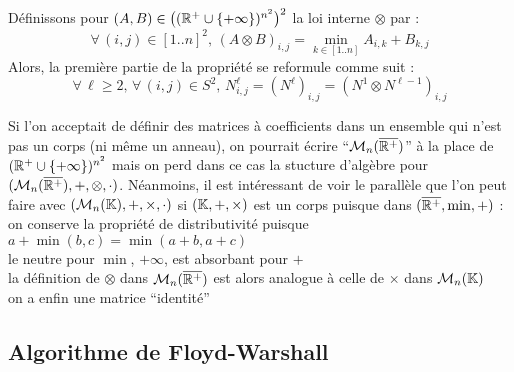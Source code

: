 		Définissons pour \((A,B) \in \big( (\mathbb{R}^+ \cup \{+\infty\})^{n^2} \big)^2\) la loi interne \(\otimes\) par :
			\[
				\forall\,(i,j)\in[1..n]^2,\, (A\otimes B)_{i,j} = \min_{k\in[1..n]} A_{i,k} + B_{k,j} 
			\]
		Alors, la première partie de la propriété \iv se reformule comme suit :
			\[
				\forall\,\ell\geq 2,\,\forall\, (i,j)\in S^2,\, N^\ell_{i,j} = (N^\ell)_{i,j} = (N^1 \otimes N^{\ell-1})_{i,j}
			\]
		
		\begin{Remarque}
			Si l'on acceptait de définir des matrices à coefficients dans un ensemble qui n'est pas un corps (ni même un anneau), on pourrait écrire ``\(\mathcal{M}_n(\overline{\mathbb{R}^+})\)'' à la place de \((\mathbb{R}^+ \cup \{+\infty\})^{n^2}\) mais on perd dans ce cas la stucture d'algèbre pour \((\mathcal{M}_n(\overline{\mathbb{R}^+}),+,\otimes,\cdot)\). \nt
			Néanmoins, il est intéressant de voir le parallèle que l'on peut faire avec \((\mathcal{M}_n(\mathbb{K}),+,\times,\cdot)\) si \((\mathbb{K},+,\times)\) est un corps puisque dans \((\overline{\mathbb{R}^+},\mathrm{min},+)\) : \\
				 \bdot on conserve la propriété de distributivité puisque \(a + \min(b,c) = \min(a+b,a+c)\) \\
				 \bdot le neutre pour \(\min\), \(+\infty\), est absorbant pour \(+\) \\
				 \bdot la définition de \(\otimes\) dans \(\mathcal{M}_n(\overline{\mathbb{R}^+})\) est alors analogue à celle de \(\times\) dans \(\mathcal{M}_n(\mathbb{K})\) \\
				 \bdot on a enfin une matrice ``identité''
		\end{Remarque}
	
	\subsection{Algorithme de Floyd-Warshall}
			
